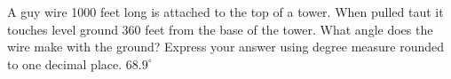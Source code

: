  {A guy wire 1000 feet long is attached to the top of a tower. When pulled taut it touches level ground 360 feet from the base of the tower. What angle does the wire make with the ground? Express your answer using degree measure rounded to one decimal place.}
{ $68.9^{\circ}$}
